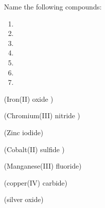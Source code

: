 \documentclass[main.tex]{subfiles}
\begin{document}
\begin{multicols*}{2}
\begin{question}[ID=\the\value{numA}]
Name the following compounds:
   \begin{multicols}{2}\noindent
  \begin{enumerate} [topsep=0pt, partopsep=0pt, label=(\alph*), leftmargin=.5cm]
\item  {} %
\item  {} %
\item  {} %
\item  {} %
\item  {} %
\item  {} %
\item  {} %
\end{enumerate}  \end{multicols} 
\end{question}
\begin{solution}
\begin{inparaenum}[(a)]
\item  {}  (Iron(II) oxide )
\item  {}  (Chromium(III) nitride )
\item  {}  (Zinc  iodide)
\item  {}  (Cobalt(II) sulfide )
\item  {}  (Manganese(III)  fluoride)
\item  {}  (copper(IV)  carbide)
\item  {}  (silver oxide)
\end{inparaenum}\hspace{0.1cm}\end{solution}


\end{multicols*}
\end{document}
